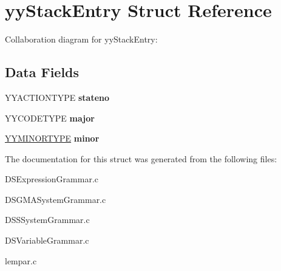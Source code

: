 \hypertarget{structyy_stack_entry}{
\section{yyStackEntry Struct Reference}
\label{structyy_stack_entry}
}


Collaboration diagram for yyStackEntry:\subsection*{Data Fields}
\begin{DoxyCompactItemize}
\item 
\hypertarget{structyy_stack_entry_a29bdc76b71291cde3297dfbf76dc0ab6}{
YYACTIONTYPE {\bfseries stateno}}
\label{structyy_stack_entry_a29bdc76b71291cde3297dfbf76dc0ab6}

\item 
\hypertarget{structyy_stack_entry_aa6e509523c026d82f666907dae4e409e}{
YYCODETYPE {\bfseries major}}
\label{structyy_stack_entry_aa6e509523c026d82f666907dae4e409e}

\item 
\hypertarget{structyy_stack_entry_ae9380fcd3ab9ffa6c6624cba73807585}{
\hyperlink{union_y_y_m_i_n_o_r_t_y_p_e}{YYMINORTYPE} {\bfseries minor}}
\label{structyy_stack_entry_ae9380fcd3ab9ffa6c6624cba73807585}

\end{DoxyCompactItemize}


The documentation for this struct was generated from the following files:\begin{DoxyCompactItemize}
\item 
DSExpressionGrammar.c\item 
DSGMASystemGrammar.c\item 
DSSSystemGrammar.c\item 
DSVariableGrammar.c\item 
lempar.c\end{DoxyCompactItemize}
